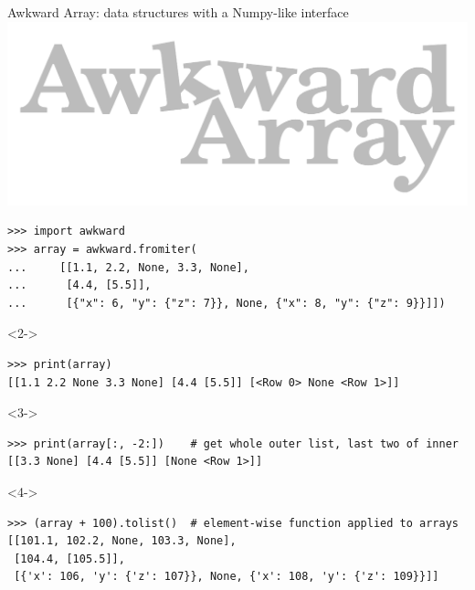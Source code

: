 \documentclass[aspectratio=169]{beamer}
\begin{document}
\begin{frame}[fragile]{Awkward Array: data structures with a Numpy-like interface}
\small
\hfill\includegraphics[height=2 cm]{awkward-logo.pdf}

\vspace{-2 cm}
\begin{verbatim}
>>> import awkward
>>> array = awkward.fromiter(
...     [[1.1, 2.2, None, 3.3, None],
...      [4.4, [5.5]],
...      [{"x": 6, "y": {"z": 7}}, None, {"x": 8, "y": {"z": 9}}]])
\end{verbatim}

\begin{uncoverenv}<2->
\begin{verbatim}
>>> print(array)
[[1.1 2.2 None 3.3 None] [4.4 [5.5]] [<Row 0> None <Row 1>]]
\end{verbatim}
\end{uncoverenv}

\begin{uncoverenv}<3->
\begin{verbatim}
>>> print(array[:, -2:])    # get whole outer list, last two of inner
[[3.3 None] [4.4 [5.5]] [None <Row 1>]]
\end{verbatim}
\end{uncoverenv}

\begin{uncoverenv}<4->
\begin{verbatim}
>>> (array + 100).tolist()  # element-wise function applied to arrays
[[101.1, 102.2, None, 103.3, None],
 [104.4, [105.5]],
 [{'x': 106, 'y': {'z': 107}}, None, {'x': 108, 'y': {'z': 109}}]]
\end{verbatim}
\end{uncoverenv}
\end{frame}
\end{document}
